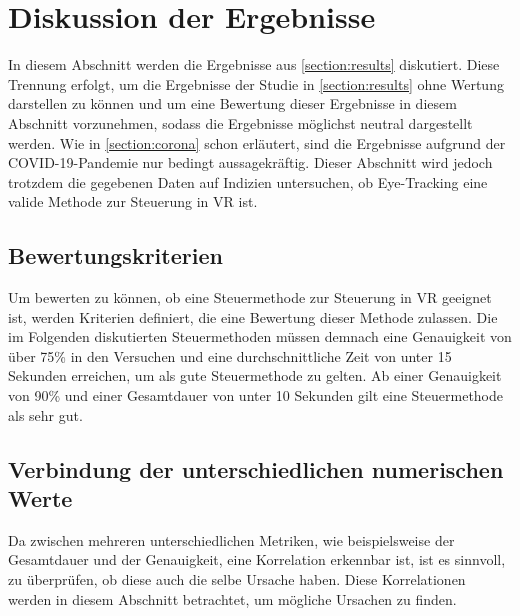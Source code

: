 
\chapter{Diskussion der Ergebnisse}
\label{section:discussion}
In diesem Abschnitt werden die Ergebnisse aus \autoref{section:results} diskutiert. Diese Trennung erfolgt, um die Ergebnisse der Studie in \autoref{section:results} ohne Wertung darstellen zu können und um eine Bewertung dieser Ergebnisse in diesem Abschnitt vorzunehmen, sodass die Ergebnisse möglichst neutral dargestellt werden. Wie in \autoref{section:corona} schon erläutert, sind die Ergebnisse aufgrund der \ac{COVID-19}-Pandemie nur bedingt aussagekräftig. Dieser Abschnitt wird jedoch trotzdem die gegebenen Daten auf Indizien untersuchen, ob Eye-Tracking eine valide Methode zur Steuerung in \ac{VR} ist. 

\section{Bewertungskriterien}
\label{section:criteria}
Um bewerten zu können, ob eine Steuermethode zur Steuerung in \ac{VR} geeignet ist, werden Kriterien definiert, die eine Bewertung dieser Methode zulassen. Die im Folgenden diskutierten Steuermethoden müssen demnach eine Genauigkeit von über 75\% in den Versuchen und eine durchschnittliche Zeit von unter 15 Sekunden erreichen, um als gute Steuermethode zu gelten. Ab einer Genauigkeit von 90\% und einer Gesamtdauer von unter 10 Sekunden gilt eine Steuermethode als sehr gut.

\section{Verbindung der unterschiedlichen numerischen Werte}
Da zwischen mehreren unterschiedlichen Metriken, wie beispielsweise der Gesamtdauer und der Genauigkeit, eine Korrelation erkennbar ist, ist es sinnvoll, zu überprüfen, ob diese auch die selbe Ursache haben. Diese Korrelationen werden in diesem Abschnitt betrachtet, um mögliche Ursachen zu finden.

